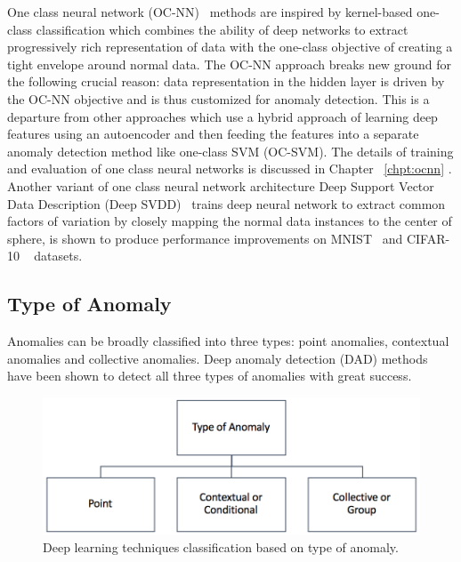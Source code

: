 One class neural network (OC-NN)~\cite{chalapathy2018anomaly} methods are inspired by kernel-based one-class classification which combines the ability of deep networks to extract progressively rich representation of data with the one-class objective of creating a tight envelope around normal data. The OC-NN approach breaks new ground for the following crucial reason: data representation in the hidden layer is driven by the OC-NN objective and is thus customized for anomaly detection. This is a departure from other approaches which use a hybrid approach of learning deep features using an autoencoder and then feeding the features into a separate anomaly detection method like one-class SVM (OC-SVM).  The details of training and evaluation of one class neural networks is discussed in Chapter ~\ref{chpt:ocnn} . Another variant of one class neural network architecture Deep Support Vector Data Description (Deep SVDD)~\cite{ruff2018deep} trains deep neural network to extract common factors of variation by closely mapping the normal data instances to the center of sphere, is shown to produce performance improvements on MNIST~\cite{lecun2010mnist} and CIFAR-10 ~\cite{krizhevsky2009learning} datasets.




\subsection{Type of Anomaly}
\label{sec:typeBasedAD}
Anomalies can be broadly  classified into three types: point anomalies, contextual anomalies and collective anomalies. Deep anomaly detection (DAD) methods have been shown to detect all three types of anomalies with great success.

\begin{figure}[h]
\centering
\includegraphics[scale=0.7]{images/TypeOfAnomaly}
\captionsetup{justification=centering}
\caption{Deep learning techniques classification based on type of anomaly.}
\label{fig:typeOfAnomaly}
\end{figure}


